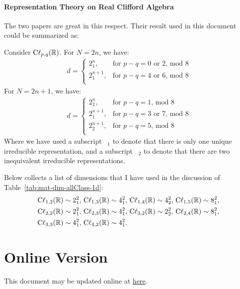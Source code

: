 \documentclass{article}
\begin{document}
\paragraph{Representation Theory on Real Clifford Algebra}
The two papers \cite{Okubo1991a}\cite{Okubo1991} are great in this respect.
Their result used in this document could be summarized as:
\begin{thm}
    Consider $\mathrm{C\ell}_{p,q}(\mathbb{R})$. For $N=2n$, we have:
    \begin{align}
        d= \begin{cases}
              2^n_1, & \text{for } p-q=0\text{ or }2\text{, mod }8 \\
              2^{n+1}_1, & \text{for } p-q=4\text{ or }6\text{, mod }8 \\
          \end{cases}
    \end{align}
    For $N=2n+1$, we have:
    \begin{align}
        d= \begin{cases}
              2^n_2, & \text{for } p-q=1\text{, mod }8 \\
              2^{n+1}_1, & \text{for } p-q=3\text{ or }7\text{, mod }8 \\
              2^{n+1}_2, & \text{for } p-q=5\text{, mod }8 \\
          \end{cases}
    \end{align}
    Where we have used a subscript $\phantom{1}_1$ to denote that there is only
    one unique irreducible representation, and a subscript $\phantom{1}_2$ to
    denote that there are two inequivalent irreducible representations.
\end{thm}
Below collects a list of dimensions that I have used in the discussion of
Table~\ref{tab:mat-dim-allClass-1d}:
\begin{align*}
    &
    \mathrm{C\ell}_{1,2}(\mathbb{R})\sim 2^2_1,\, \mathrm{C\ell}_{1,3}(\mathbb{R})\sim 4^2_1,\,
    \mathrm{C\ell}_{1,4}(\mathbb{R})\sim 4^2_2,\, \mathrm{C\ell}_{1,5}(\mathbb{R})\sim 8^2_1,\,
    \\&
    \mathrm{C\ell}_{2,2}(\mathbb{R})\sim 2^2_1,\, \mathrm{C\ell}_{2,3}(\mathbb{R})\sim 4^2_1,\,
    \mathrm{C\ell}_{3,2}(\mathbb{R})\sim 2^2_2,\, \mathrm{C\ell}_{2,4}(\mathbb{R})\sim 8^2_1,\,
    \\&
    \mathrm{C\ell}_{3,3}(\mathbb{R})\sim 4^2_1,\, \mathrm{C\ell}_{4,2}(\mathbb{R})\sim 4^2_1.
\end{align*}

\section{Online Version}
This document may be updated online at
\href{https://github.com/we-taper/Draft/tree/master/Notes%20of%20various%20papers/Chiu%20Minimal%20Dirac%20Hamiltonian%20Method}{here}.


{}

\printnomenclature
\end{document}
